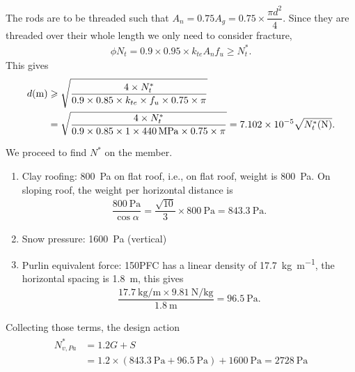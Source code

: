\begin{solution}
The rods are to be threaded such that $A_n=0.75A_g=0.75\times\dfrac{\pi{}d^2}{4}$. Since they are threaded over their whole length we only need to consider fracture,
\begin{gather*}
\phi{}N_t=0.9\times0.95\times{}k_{te}A_nf_u\geqslant{}N^*_t.
\end{gather*}
This gives
\begin{gather*}
\begin{split}
d(\si{\meter})&\geqslant\sqrt{\dfrac{4\times{}N^*_t}{0.9\times0.85\times{}k_{te}\times{}f_u\times0.75\times\pi{}}}\\&=\sqrt{\dfrac{4\times{}N^*_t}{0.9\times0.85\times{}1\times{}\SI{440}{\mega\pascal}\times0.75\times\pi{}}}=\num{7.102e-5}\sqrt{N^*_t(\si{\newton})}.
\end{split}
\end{gather*}

We proceed to find $N^*$ on the member.
\begin{enumerate}
\item Clay roofing: \SI{800}{\pascal} on flat roof, i.e., on flat roof, weight is \SI{800}{\pascal}. On sloping roof, the weight per horizontal distance is
\begin{gather*}
\dfrac{\SI{800}{\pascal}}{\cos\alpha}=\dfrac{\sqrt{10}}{3}\times\SI{800}{\pascal}=\SI{843.3}{\pascal}.
\end{gather*}
\begin{figure}[H]
\centering\footnotesize
{}
\end{figure}
\item Snow pressure: \SI{1600}{\pascal} (vertical)
\item Purlin equivalent force: 150PFC has a linear density of \SI{17.7}{\kilogram\per\meter}, the horizontal spacing is \SI{1.8}{\meter}, this gives
\begin{gather*}
\dfrac{\SI{17.7}{\kilogram\per\meter}\times\SI{9.81}{\newton\per\kilogram}}{\SI{1.8}{\meter}}=\SI{96.5}{\pascal}.
\end{gather*}
\end{enumerate}
Collecting those terms, the design action
\begin{gather*}
\begin{split}
N^*_{v,Pa}&=1.2G+S\\&=1.2\times\left(\SI{843.3}{\pascal}+\SI{96.5}{\pascal}\right)+\SI{1600}{\pascal}=\SI{2728}{\pascal}
\end{split}
\end{gather*}


\end{solution}
